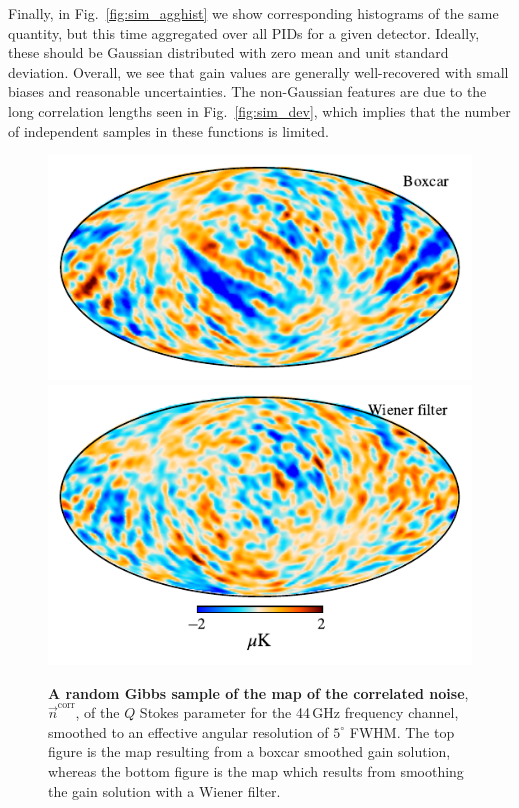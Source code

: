 \documentclass[twocolumn]{aa}
\newcommand{\n}[0]{\vec{n}}
\begin{document}
Finally, in Fig.~\ref{fig:sim_agghist} we show corresponding
histograms of the same quantity, but this time aggregated over all
PIDs for a given detector. Ideally, these should be Gaussian
distributed with zero mean and unit standard deviation. Overall, we
see that gain values are generally well-recovered with small biases
and reasonable uncertainties. The non-Gaussian features are due to the
long correlation lengths seen in Fig.~\ref{fig:sim_dev}, which implies
that the number of independent samples in these functions is limited.
\begin{figure}[t]
    \center
    \includegraphics[width=\linewidth]{figs/ncorr_Q_5deg_boxcar.pdf}\\\vspace*{-3mm}
    \includegraphics[width=\linewidth]{figs/ncorr_Q_5deg_wiener.pdf}
    \caption{\textbf{A random Gibbs sample of the map of the correlated noise}, $\n^{\mathrm{corr}}$, of the $Q$ Stokes parameter for the 44\,GHz
    frequency channel, smoothed to an effective angular resolution of
    $5^{\circ}$ FWHM. The top figure is the map resulting from a
    boxcar smoothed gain solution, whereas the bottom figure is the map which
    results from smoothing the gain solution with a Wiener filter.
    }\label{fig:corrstripes}
\end{figure}
\end{document}
